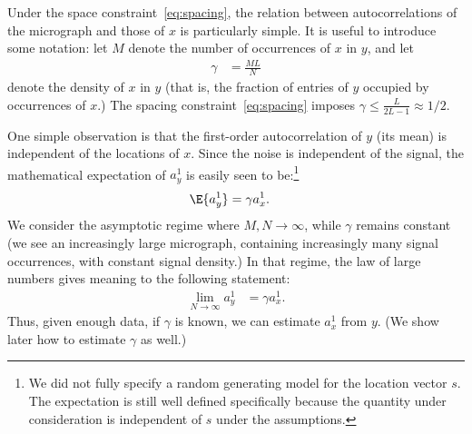 \documentclass[9pt,twocolumn,twoside,lineno]{pnas-new}
\begin{document}
Under the space constraint~\eqref{eq:spacing}, the relation between autocorrelations of the micrograph and those of $x$ is particularly simple. It is useful to introduce some notation: let $M$ denote the number of occurrences of $x$ in $y$, and let
\begin{align}
\gamma & = \frac{M L}{N}
\end{align}
denote the density of $x$ in $y$ (that is, the fraction of entries of $y$ occupied by occurrences of $x$.) The spacing constraint~\eqref{eq:spacing} imposes $\gamma\leq\frac{L}{2L-1}\approx 1/2$.

One simple observation is that the first-order autocorrelation of $y$ (its mean) is independent of the locations of $x$. Since the noise is independent of the signal, the mathematical expectation of $a_y^1$ is easily seen to be:\footnote{We did not fully specify a random generating model for the location vector $s$. The expectation is still well defined specifically because the quantity under consideration is independent of $s$ under the assumptions.}
\begin{align*}
\E\{ a_y^1 \} & = \gamma a_x^1.
\end{align*}
We consider the asymptotic regime where $M, N\to\infty$, while $\gamma$ remains constant (we see an increasingly large micrograph, containing increasingly many signal occurrences, with constant signal density.) In that regime, the law of large numbers gives meaning to the following statement:
\begin{align} \label{eq:mean_micrograph}
\lim_{N\to\infty} a_y^1 & = \gamma a_{x}^1.
\end{align}
Thus, given enough data, if $\gamma$ is known, we can estimate $a_x^1$ from $y$. (We show later how to estimate $\gamma$ as well.)
\end{document}
